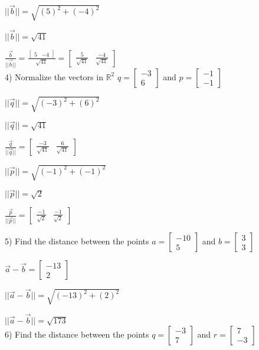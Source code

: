 \documentclass[a4paper]{article}
\begin{document}
$||\vec{b}|| = \sqrt{(5)^2+(-4)^2}$

$||\vec{b}|| = \sqrt{41}$

$\frac{\vec{b}}{||\vec{b}||} = \frac{\begin{bmatrix}
5&-4
\end{bmatrix}}{\sqrt{41}} = \begin{bmatrix}
\frac{5}{\sqrt{41}}&\frac{-4}{\sqrt{41}}
\end{bmatrix}$\\

4) Normalize the vectors in $\mathbb{R}^2$ $q = \begin{bmatrix}
-3\\
6
\end{bmatrix}$ and $p = \begin{bmatrix}
-1\\
-1
\end{bmatrix}$

$||\vec{q}|| = \sqrt{(-3)^2+(6)^2}$

$||\vec{q}|| = \sqrt{41}$

$\frac{\vec{q}}{||\vec{q}||} = \begin{bmatrix}
\frac{-3}{\sqrt{41}}&\frac{6}{\sqrt{41}}
\end{bmatrix}$

$||\vec{p}|| = \sqrt{(-1)^2+(-1)^2}$

$||\vec{p}|| = \sqrt{2}$

$\frac{\vec{p}}{||\vec{p}||} = \begin{bmatrix}
\frac{-1}{\sqrt{2}}&\frac{-1}{\sqrt{2}}
\end{bmatrix}$

5) Find the distance between the points $a = \begin{bmatrix}
-10\\
5
\end{bmatrix}$ and $b = \begin{bmatrix}
3\\
3
\end{bmatrix}$

$\vec{a}-\vec{b} = \begin{bmatrix}
-13\\
2
\end{bmatrix}$

$||\vec{a}-\vec{b}|| = \sqrt{(-13)^2+(2)^2}$

$||\vec{a}-\vec{b}|| = \sqrt{173}$\\

6) Find the distance between the points $q = \begin{bmatrix}
-3\\
7
\end{bmatrix}$ and $r = \begin{bmatrix}
7\\
-3
\end{bmatrix}$
\end{document}
